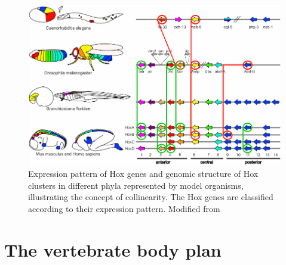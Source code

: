 \begin{figure}
\centering
\includegraphics[width=1\textwidth]{Figures/Intro/hox_colinearity.pdf}
\caption[Hox colinearity]{ Expression pattern of Hox genes and genomic structure of Hox clusters in different phyla represented by model organisms, illustrating the concept of collinearity. The Hox genes are classified according to their expression pattern. Modified from \parencite{hueber_improving_2010}
}
\label{fig:Intro_hox_colinear}
\end{figure} 

\section{The vertebrate body plan}


